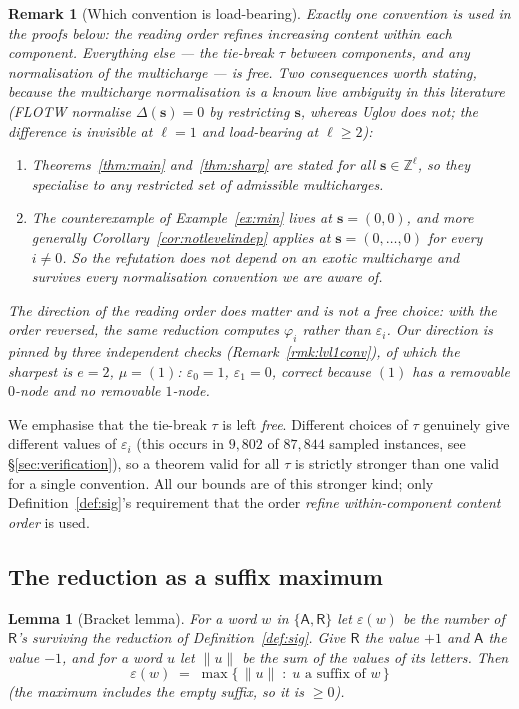 \documentclass[11pt]{article}
\newtheorem{lemma}[theorem]{Lemma}
\newtheorem{remark}[theorem]{Remark}
\theoremstyle{definition}
\newcommand{\ZZ}{\mathbb{Z}}
\newcommand{\eps}{\varepsilon}
\newcommand{\Aa}{{\mathsf A}}
\newcommand{\Rr}{{\mathsf R}}
\newcommand{\bs}{\mathbf{s}}
\begin{document}
\begin{remark}[Which convention is load-bearing]\label{rmk:whichconv}
Exactly one convention is used in the proofs below: \emph{the reading order
refines increasing content within each component}. Everything else --- the
tie-break $\tau$ between components, and any normalisation of the multicharge
--- is free. Two consequences worth stating, because the multicharge
normalisation is a known live ambiguity in this literature (FLOTW normalise
$\Delta(\bs) = 0$ by restricting $\bs$, whereas Uglov does not; the difference
is invisible at $\ell = 1$ and load-bearing at $\ell \ge 2$):
\begin{enumerate}
\item Theorems~\ref{thm:main} and~\ref{thm:sharp} are stated for all
$\bs \in \ZZ^\ell$, so they specialise to any restricted set of admissible
multicharges.
\item The counterexample of Example~\ref{ex:min} lives at
$\bs = (0,0)$, and more generally Corollary~\ref{cor:notlevelindep} applies at
$\bs = (0,\dots,0)$ for every $i \ne 0$. So the refutation does not depend on
an exotic multicharge and survives every normalisation convention we are aware
of.
\end{enumerate}
The direction of the reading order does matter and is not a free choice: with
the order reversed, the same reduction computes $\varphi_i$ rather than
$\eps_i$. Our direction is pinned by three independent checks
(Remark~\ref{rmk:lvl1conv}), of which the sharpest is $e = 2$, $\mu = (1)$:
$\eps_0 = 1$, $\eps_1 = 0$, correct because $(1)$ has a removable
$0$-node and no removable $1$-node.
\end{remark}

We emphasise that the tie-break $\tau$ is left \emph{free}. Different
choices of $\tau$ genuinely give different values of $\eps_i$ (this occurs
in $9{,}802$ of $87{,}844$ sampled instances, see
\S\ref{sec:verification}), so a theorem valid for all $\tau$ is strictly
stronger than one valid for a single convention. All our bounds are of
this stronger kind; only Definition~\ref{def:sig}'s requirement that the
order \emph{refine within-component content order} is used.

\subsection{The reduction as a suffix maximum}

\begin{lemma}[Bracket lemma]\label{lem:bracket}
For a word $w$ in $\{\Aa,\Rr\}$ let $\eps(w)$ be the number of $\Rr$'s
surviving the reduction of Definition~\ref{def:sig}. Give $\Rr$ the value
$+1$ and $\Aa$ the value $-1$, and for a word $u$ let $\|u\|$ be the sum
of the values of its letters. Then
\[
  \eps(w) \;=\; \max\{\, \|u\| \;:\; u \text{ a suffix of } w \,\}
\]
(the maximum includes the empty suffix, so it is $\ge 0$).
\end{lemma}
\end{document}
